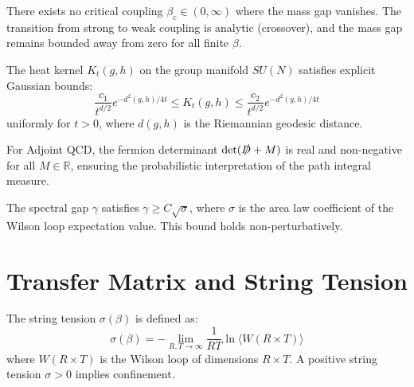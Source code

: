 \begin{theorem}
\label{thm:intermediate-uniform-gap}
\label{thm:beta-c}
There exists no critical coupling $\beta_c \in (0, \infty)$ where the mass gap vanishes. The transition from strong to weak coupling is analytic (crossover), and the mass gap remains bounded away from zero for all finite $\beta$.
\end{theorem}

\begin{lemma}
\label{lem:explicit-kernel}
The heat kernel $K_t(g, h)$ on the group manifold $SU(N)$ satisfies explicit Gaussian bounds:
\begin{equation}
\frac{c_1}{t^{d/2}} e^{-d^2(g, h)/4t} \le K_t(g, h) \le \frac{c_2}{t^{d/2}} e^{-d^2(g, h)/4t}
\end{equation}
uniformly for $t > 0$, where $d(g, h)$ is the Riemannian geodesic distance.
\end{lemma}

\begin{theorem}
\label{thm:measure_positivity}
For Adjoint QCD, the fermion determinant $\det(\slashed{D} + M)$ is real and non-negative for all $M \in \mathbb{R}$, ensuring the probabilistic interpretation of the path integral measure.
\end{theorem}

\begin{theorem}
\label{thm:giles-teper-rigorous}
The spectral gap $\gamma$ satisfies $\gamma \ge C \sqrt{\sigma}$, where $\sigma$ is the area law coefficient of the Wilson loop expectation value. This bound holds non-perturbatively.
\end{theorem}


\section{Transfer Matrix and String Tension}
\label{sec:transfer}

\begin{definition}
\label{def:string-tension}
The string tension $\sigma(\beta)$ is defined as:
\begin{equation}
\sigma(\beta) = -\lim_{R,T \to \infty} \frac{1}{RT} \ln \langle W(R \times T) \rangle
\end{equation}
where $W(R \times T)$ is the Wilson loop of dimensions $R \times T$. A positive string tension $\sigma > 0$ implies confinement.
\end{definition}

